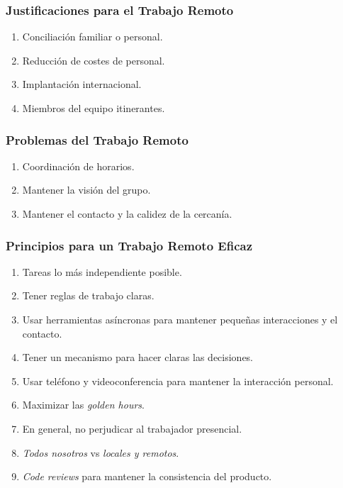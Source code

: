 \documentclass[a4paper,slidestop,xcolor=pst,dvips,blue]{beamer}
\begin{document}
\begin{frame}[c]
	\frametitle{Justificaciones para el Trabajo Remoto}
	\begin{enumerate}[<+->]
        \item Conciliación familiar o personal.
        \item Reducción de costes de personal.
        \item Implantación internacional.
        \item Miembros del equipo itinerantes.
	\end{enumerate}
\end{frame}

\begin{frame}[c]
	\frametitle{Problemas del Trabajo Remoto}
	\begin{enumerate}[<+->]
        \item Coordinación de horarios.
        \item Mantener la visión del grupo.
        \item Mantener el contacto y la calidez de la cercanía.
	\end{enumerate}
\end{frame}

\begin{frame}[c]
	\frametitle{Principios para un Trabajo Remoto Eficaz}
	\begin{enumerate}[<+->]
        \item Tareas lo más independiente posible.
        \item Tener reglas de trabajo claras.
        \item Usar herramientas asíncronas para mantener pequeñas interacciones y el contacto.
        \item Tener un mecanismo para hacer claras las decisiones.
        \item Usar teléfono y videoconferencia para mantener la interacción personal.
        \item Maximizar las \emph{golden hours}.
        \item En general, no perjudicar al trabajador presencial.
        \item \emph{Todos nosotros} vs \emph{locales y remotos}.
        \item \emph{Code reviews} para mantener la consistencia del producto.
	\end{enumerate}
\end{frame}

\end{document}
